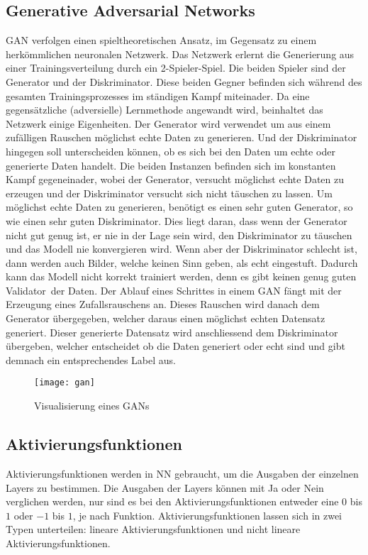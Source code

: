 \subsection{Generative Adversarial Networks}
\label{sub:gan}
\gls{GAN} verfolgen einen spieltheoretischen Ansatz, im Gegensatz zu einem herkömmlichen
neuronalen Netzwerk. Das Netzwerk erlernt die Generierung aus einer Trainingsverteilung durch ein 2-Spieler-Spiel. Die
beiden Spieler sind der Generator und der Diskriminator. Diese beiden Gegner befinden sich während des gesamten
Trainingsprozesses im ständigen Kampf miteinader. Da eine gegensätzliche (adversielle) Lernmethode angewandt wird,
beinhaltet das Netzwerk einige Eigenheiten.
\newline
\newline
Der Generator wird verwendet um aus einem zufälligen Rauschen möglichst echte Daten zu generieren. Und der Diskriminator
hingegen soll unterscheiden können, ob es sich bei den Daten um echte oder generierte Daten handelt. Die beiden Instanzen
befinden sich im konstanten Kampf gegeneinader, wobei der Generator, versucht möglichst echte Daten zu erzeugen und der
Diskriminator versucht sich nicht täuschen zu lassen. Um möglichst echte Daten zu generieren, benötigt es einen sehr
guten Generator, so wie einen sehr guten Diskriminator. Dies liegt daran, dass wenn der Generator nicht gut genug ist, er
nie in der Lage sein wird, den Diskriminator zu täuschen und das Modell nie konvergieren wird. Wenn aber der
Diskriminator schlecht ist, dann werden auch Bilder, welche keinen Sinn geben, als echt eingestuft. Dadurch kann das
Modell nicht korrekt trainiert werden, denn es gibt keinen genug guten \flqq Validator\frqq \ der Daten.
\newline
\newline
Der Ablauf eines Schrittes in einem \gls{GAN} fängt mit der Erzeugung eines Zufallsrauschens an. Dieses Rauschen wird danach
dem Generator übergegeben, welcher daraus einen möglichst echten Datensatz generiert. Dieser generierte Datensatz wird
anschliessend dem Diskriminator übergeben, welcher entscheidet ob die Daten generiert oder echt sind und gibt demnach
ein entsprechendes Label aus.
\begin{figure}[H]
	\centering
	\texttt{[image: gan]}
	\caption{Visualisierung eines GANs}
	\label{fig:GAN}
\end{figure}

\subsection{Aktivierungsfunktionen}
\label{sub:activation-functions}
Aktivierungsfunktionen werden in \gls{NN} gebraucht, um die Ausgaben der einzelnen Layers zu bestimmen. Die
Ausgaben der Layers können mit Ja oder Nein verglichen werden, nur sind es bei den Aktivierungsfunktionen entweder eine
$0$ bis $1$ oder $-1$ bis $1$, je nach Funktion. Aktivierungsfunktionen lassen sich in zwei Typen unterteilen: lineare
Aktivierungsfunktionen und nicht lineare Aktivierungsfunktionen.

